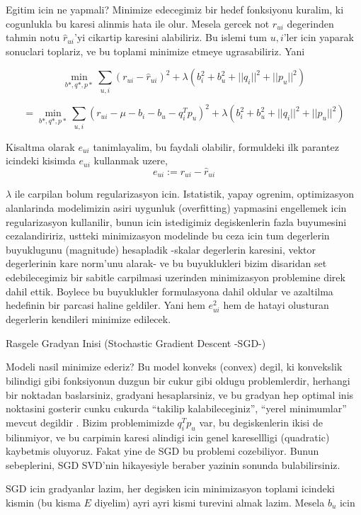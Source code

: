 \documentclass[12pt,fleqn]{article}\usepackage{../common}
\begin{document}
Egitim icin ne yapmali? Minimize edecegimiz bir hedef fonksiyonu kuralim,
ki cogunlukla bu karesi alinmis hata ile olur. Mesela gercek not
$r_{ui}$ degerinden tahmin notu $\hat{r}_{ui}$'yi cikartip karesini
alabiliriz. Bu islemi tum $u,i$'ler icin yaparak sonuclari toplariz, ve bu
toplami minimize etmeye ugrasabiliriz. Yani


$$
\min_{b*,q*,p*} \sum_{u,i} (r_{ui} - \hat{r}_{ui})^2 + 
\lambda (b_i^2 + b_u^2 + ||q_i||^2 + ||p_u||^2)
$$

$$
= \min_{b*,q*,p*} \sum_{u,i} (r_{ui} - \mu - b_i - b_u - q_i^Tp_u)^2 + 
\lambda (b_i^2 + b_u^2 + ||q_i||^2 + ||p_u||^2)
$$

Kisaltma olarak $e_{ui}$ tanimlayalim, bu faydali olabilir, formuldeki ilk
parantez icindeki kisimda $e_{ui}$ kullanmak uzere,
$$ e_{ui} := r_{ui} - \hat{r}_{ui} $$

$\lambda$ ile carpilan bolum regularizasyon icin. Istatistik, yapay
ogrenim, optimizasyon alanlarinda modelimizin asiri uygunluk (overfitting)
yapmasini engellemek icin regularizasyon kullanilir, bunun icin istedigimiz
degiskenlerin fazla buyumesini cezalandiririz, ustteki minimizasyon
modelinde bu ceza icin tum degerlerin buyuklugunu (magnitude) hesapladik
-skalar degerlerin karesini, vektor degerlerinin kare norm'unu alarak- ve
bu buyuklukleri bizim disaridan set edebilecegimiz bir sabitle carpilmasi
uzerinden minimizasyon problemine direk dahil ettik. Boylece bu buyuklukler
formulasyona dahil oldular ve azaltilma hedefinin bir parcasi haline
geldiler. Yani hem $e_{ui}^2$ hem de hatayi olusturan degerlerin kendileri
minimize edilecek.

Rasgele Gradyan Inisi (Stochastic Gradient Descent -SGD-)

Modeli nasil minimize ederiz? Bu model konveks (convex) degil, ki
konvekslik bilindigi gibi fonksiyonun duzgun bir cukur gibi oldugu
problemlerdir, herhangi bir noktadan baslarsiniz, gradyani hesaplarsiniz,
ve bu gradyan hep optimal inis noktasini gosterir cunku cukurda ``takilip
kalabileceginiz'', ``yerel minimumlar'' mevcut degildir . Bizim
problemimizde $q_i^Tp_u$ var, bu degiskenlerin ikisi de bilinmiyor, ve bu
carpimin karesi alindigi icin genel karesellligi (quadratic) kaybetmis
oluyoruz. Fakat yine de SGD bu problemi cozebiliyor. Bunun sebeplerini, SGD
SVD'nin hikayesiyle beraber yazinin sonunda bulabilirsiniz. 

SGD icin gradyanlar lazim, her degisken icin minimizasyon toplami icindeki
kismin (bu kisma $E$ diyelim) ayri ayri kismi turevini almak lazim. Mesela
$b_u$ icin
\end{document}
